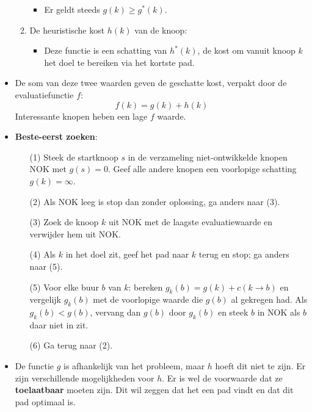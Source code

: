 \begin{itemize}
\begin{enumerate}
\begin{itemize}
			\item Er geldt steeds $g(k) \geq g^*(k)$.
		\end{itemize} 
		\item De heuristische kost $h(k)$ van de knoop:
		\begin{itemize}
			\item Deze functie is een schatting van $h^*(k)$, de kost om vanuit knoop $k$ het doel te bereiken via het kortste pad.
		\end{itemize}
	\end{enumerate}
	\item De som van deze twee waarden geven de geschatte kost, verpakt door de evaluatiefunctie $f$:
	$$f(k) = g(k) + h(k)$$
	\alert Interessante knopen heben een lage $f$ waarde. 
	\item \textbf{Beste-eerst zoeken}:
	\begin{enumerate}
		\item[(1)] Steek de startknoop $s$ in de verzameling niet-ontwikkelde knopen NOK met $g(s) = 0$. Geef alle andere knopen een voorlopige schatting $g(k) = \infty$.
		\item[(2)] Als NOK leeg is stop dan zonder oplossing, ga anders naar (3).
		\item[(3)] Zoek de knoop $k$ uit NOK met de laagste evaluatiewaarde en verwijder hem uit NOK.
		\item[(4)] Als $k$ in het doel zit, geef het pad naar $k$ terug en stop; ga anders naar (5).
		\item[(5)] Voor elke buur $b$ van $k$: bereken $g_k(b) = g(k) + c(k \rightarrow b)$ en vergelijk $g_k(b)$ met de voorlopige waarde die $g(b)$ al gekregen had. Als $g_k(b) < g(b)$, vervang dan $g(b)$ door $g_k(b)$ en steek $b$ in NOK als $b$ daar niet in zit.
		\item[(6)] Ga terug naar (2).
	\end{enumerate}
	\item De functie $g$ is afhankelijk van het probleem, maar $h$ hoeft dit niet te zijn. Er zijn verschillende mogelijkheden voor $h$. Er is wel de voorwaarde dat ze \textbf{toelaatbaar} moeten zijn. Dit wil zeggen dat het een pad vindt en dat dit pad optimaal is.
\end{itemize}
